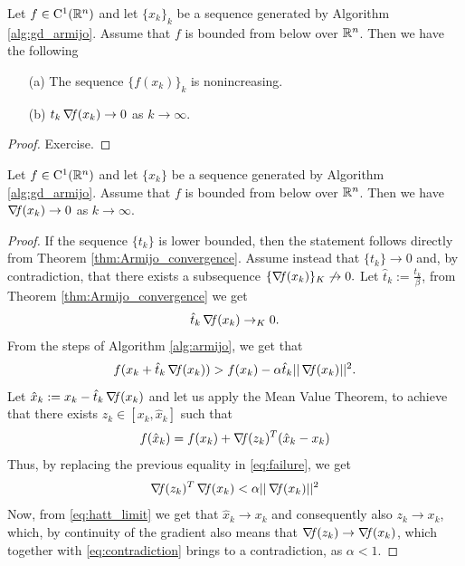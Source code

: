 \documentclass[10pt,a4paper]{article}
\begin{document}
\begin{theorem}\label{thm:Armijo_convergence}
	Let $f\in \mathord{\mathrm{C^1}}(\mathbb{R}^n)$ and let $\{x_k\}_k$ be a sequence generated by Algorithm \ref{alg:gd_armijo}. Assume that $f$ is bounded from below over $\mathbb{R}^n$. Then we have the following
	\begin{itemize}
		\item[(a)] The sequence $\{f(x_k)\}_k$ is nonincreasing. 
		\item[(b)] $t_k\operatorname*{\mathit{\nabla \!f}}(x_k) \to 0$ as $k\to \infty$.
	\end{itemize}
\end{theorem}
\begin{proof}
	Exercise.
\end{proof}
\begin{theorem}\label{thm:Armijo_convergence_p2}
	Let $f\in \mathord{\mathrm{C^1}}(\mathbb{R}^n)$ and let $\{x_k\}$ be a sequence generated by Algorithm \ref{alg:gd_armijo}. Assume that $f$ is bounded from below over $\mathbb{R}^n$. Then we have $\operatorname*{\mathit{\nabla \!f}}(x_k) \to 0$ as $k\to \infty$.
\end{theorem}
\begin{proof}
	If the sequence $\{t_k\}$ is lower bounded, then the statement follows directly from Theorem \ref{thm:Armijo_convergence}. Assume instead that $\{t_k\}\to 0$ and, by contradiction, that there exists a subsequence $\{\operatorname*{\mathit{\nabla \!f}}(x_k)\}_K\not \to 0.$ 
	Let $\hat{t}_k:=\frac{t_k}{\beta}$, from Theorem \ref{thm:Armijo_convergence} we get 
	\begin{equation}\label{eq:hatt_limit}
		\hat{t}_k\operatorname*{\mathit{\nabla \!f}}(x_k) \to_K 0.
	\end{equation}
	From the steps of Algorithm \ref{alg:armijo}, we get that 
	\begin{equation}\label{eq:failure}
		f(x_k +\hat{t}_k \operatorname*{\mathit{\nabla \!f}}(x_k)) > f(x_k) - \alpha\hat{t}_k || \operatorname*{\mathit{\nabla \!f}}(x_k)||^2.
	\end{equation}
	Let $\hat{x}_k:=x_k -\hat{t}_k \operatorname*{\mathit{\nabla \!f}}(x_k)$ and let us apply the Mean Value Theorem, to achieve that there exists $z_k \in [x_k, \hat{x}_k]$ such that 
	\begin{equation}\label{eq:mvt_applied}
		f(\hat{x}_k) = f(x_k) + \operatorname*{\mathit{\nabla \!f}}(z_k)^T(\hat{x}_k-x_k)
	\end{equation}
	Thus, by replacing the previous equality in \eqref{eq:failure}, we get 
	\begin{equation}\label{eq:contradiction}
		\operatorname*{\mathit{\nabla \!f}}(z_k)^T \operatorname*{\mathit{\nabla \!f}}(x_k)< \alpha|| \operatorname*{\mathit{\nabla \!f}}(x_k)||^2
	\end{equation}
	Now, from \eqref{eq:hatt_limit} we get that $\hat{x}_k\to x_k$ and consequently also $z_k\to x_k$, which, by continuity of the gradient also means that $\operatorname*{\mathit{\nabla \!f}}(z_k)\to\operatorname*{\mathit{\nabla \!f}}(x_k)$, which together with \eqref{eq:contradiction} brings to a contradiction, as $\alpha<1$.
\end{proof}
\end{document}
